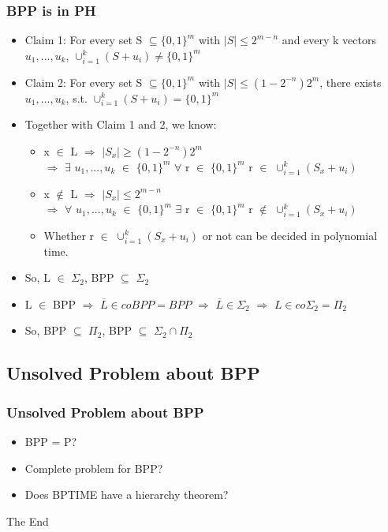 \documentclass{beamer}
\begin{document}
\begin{frame}
\frametitle{BPP is in PH}

\begin{itemize}
	\item {\color{red} Claim 1}: For every set  S $\subseteq \{0, 1\}^{m}$ with $|S| \leq 2^{m-n}$ and every k vectors $u_{1},...,u_{k}$, $\cup_{i=1}^{k}(S+u_{i}) \neq \{0, 1\}^{m}$
	\item {\color{red} Claim 2}: For every set S $\subseteq \{0, 1\}^{m}$ with $|S| \leq (1-2^{-n})2^{m}$, there exists $u_{1},...,u_{k}$, s.t. $\cup_{i=1}^{k}(S+u_{i}) = \{0, 1\}^{m}$
	\item Together with Claim 1 and 2, we know:
	\begin{itemize}
		\item x $\in$ L $\Rightarrow$ $|S_{x}| \geq (1-2^{-n})2^{m}$ \\
		$\Rightarrow$ $\exists$ $u_{1}, ...,u_{k}$ $\in$ $\{0,1\}^{m}$ $\forall$ r $\in$ $\{0,1\}^{m}$ r $\in$ $\cup_{i=1}^{k}(S_{x}+u_{i})$
		\item x $\notin$ L $\Rightarrow$ $|S_{x}| \leq 2^{m-n}$ \\
		$\Rightarrow$ $\forall$ $u_{1}, ...,u_{k}$ $\in$ $\{0,1\}^{m}$ $\exists$ r $\in$ $\{0,1\}^{m}$ r $\notin$ $\cup_{i=1}^{k}(S_{x}+u_{i})$
		\item Whether r $\in$ $\cup_{i=1}^{k}(S_{x}+u_{i})$ or not can be decided in polynomial time.
	\end{itemize} 
	\item So, L $\in$ $\Sigma_{2}$, BPP $\subseteq$ $\Sigma_{2}$
	\item L $\in$ BPP $\Rightarrow$ $\overline{L} \in coBPP = BPP$ $\Rightarrow$ $\overline{L} \in \Sigma_{2}$ $\Rightarrow$ $L \in co\Sigma_{2} = \Pi_{2}$
	\item So, BPP $\subseteq$ $\Pi_{2}$, BPP $\subseteq$ $\Sigma_{2} \cap \Pi_{2}$
\end{itemize}
\end{frame}
\subsection{Unsolved Problem about BPP}
\begin{frame}
\frametitle{Unsolved Problem about BPP}
\begin{itemize}
	\item BPP = P?
	\item Complete problem for BPP?
	\item Does BPTIME have a hierarchy theorem?
\end{itemize}
\end{frame}
\begin{frame}
\Huge{\centerline{The End}}
\end{frame}

\end{document}
